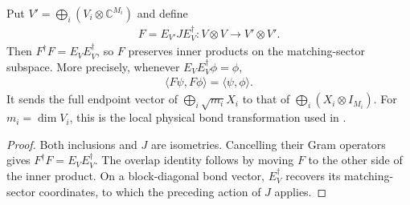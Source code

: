 \begin{lemma}%
    \label{thm:peps_full_multiplicity_bond_map}
    \leanok
    Put $V'=\bigoplus_i(V_i\otimes\mathbb C^{M_i})$ and define
    \begin{align}
        F=E_{V'}JE_V^\dagger:V\otimes V\longrightarrow V'\otimes V'.
    \end{align}
    Then $F^\dagger F=E_VE_V^\dagger$, so $F$ preserves inner products
    on the matching-sector subspace. More precisely, whenever
    $E_VE_V^\dagger\phi=\phi$,
    \begin{align}
        \langle F\psi,F\phi\rangle=\langle\psi,\phi\rangle.
    \end{align}
    It sends the full endpoint vector of
    $\bigoplus_i\sqrt{m_i}X_i$ to that of
    $\bigoplus_i(X_i\otimes I_{M_i})$.
    For $m_i=\dim V_i$, this is the local physical bond transformation
    used in \cite[Section~7]{Schuch2010PEPS}.
\end{lemma}

\begin{proof}\leanok
    Both inclusions and $J$ are isometries. Cancelling their Gram
    operators gives $F^\dagger F=E_VE_V^\dagger$. The overlap identity
    follows by moving $F$ to the other side of the inner product.
    On a block-diagonal bond vector, $E_V^\dagger$ recovers its
    matching-sector coordinates, to which the preceding action of $J$
    applies.
\end{proof}

